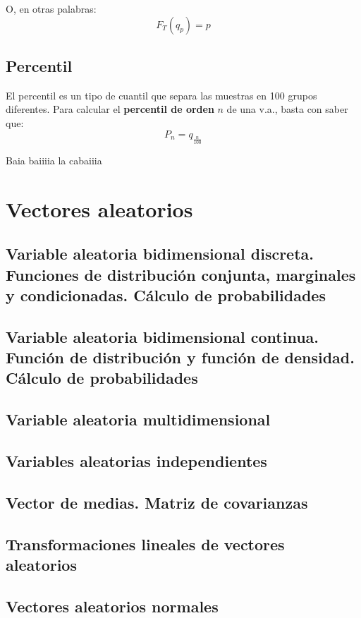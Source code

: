 \documentclass[a4paper]{book}
\begin{document}
O, en otras palabras: \[\boxed{F_T(q_p)=p}\]


\section{Percentil}
El percentil es un tipo de cuantil que separa las muestras en 100 grupos diferentes. Para calcular el \textbf{percentil de orden} $n$ de una v.a., basta con saber que: \[P_n = q_{\frac{n}{100}}\]

Baia baiiiia la cabaiiia

\chapter{Vectores aleatorios}


\section{Variable aleatoria bidimensional discreta. Funciones de distribución conjunta, marginales y condicionadas. Cálculo de probabilidades}

\section{Variable aleatoria bidimensional continua. Función de distribución y función de densidad. Cálculo de probabilidades}

\section{Variable aleatoria multidimensional}

\section{Variables aleatorias independientes}

\section{Vector de medias. Matriz de covarianzas}

\section{Transformaciones lineales de vectores aleatorios}

\section{Vectores aleatorios normales}
\end{document}
